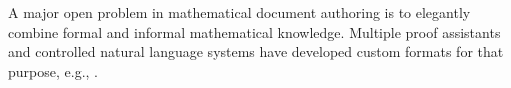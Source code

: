 
A major open problem in mathematical document authoring is to elegantly combine formal and informal mathematical knowledge.
Multiple proof assistants and controlled natural language systems have developed custom formats for that purpose, e.g., \cite{isabelle_documentoriented,mizar,plato,naproche}.



